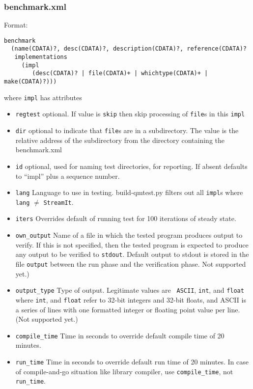 \documentclass[11pt]{article}
\begin{document}
\subsubsection{benchmark.xml}
Format:\begin{verbatim}
benchmark 
  (name(CDATA)?, desc(CDATA)?, description(CDATA)?, reference(CDATA)?
   implementations 
     (impl
        (desc(CDATA)? | file(CDATA)+ | whichtype(CDATA)+ | make(CDATA)?)))
       \end{verbatim}%
where {\tt impl} has attributes
\begin{itemize}
\item {\tt regtest} optional.  If value is {\tt skip} then skip
  processing of {\tt file}s in this {\tt impl} 
\item {\tt dir} optional to indicate that {\tt file}s are in a subdirectory.
The value is the relative address of the subdirectory from the
directory containing the benchmark.xml
\item {\tt id} optional, used for naming test directories, for
  reporting.  If absent defaults to ``impl'' plus a sequence number.
\item {\tt lang} Language to use in testing.  build-qmtest.py filters
  out all {\tt impl}s where {\tt lang} $\neq$ {\tt StreamIt}.
\item {\tt iters} Overrides default of running test for 100 iterations of steady state.
\item {\tt own\_output} Name of a file in which the tested program produces
output to verify.  If this is not specified, then the tested program is
expected to produce any output to be verified to {\tt stdout}.
Default output to stdout is stored in the file {\tt output} between the run
phase and the verification phase.
Not supported yet.)
\item {\tt output\_type} Type of output.  Legitimate values are {\tt
  ASCII}, {\tt int}, and {\tt float} where {\tt int}, and {\tt float}
  refer to 32-bit integers and 32-bit floats, and ASCII is a series of
  lines with one formatted integer or floating point value per line.
(Not supported yet.)
\item {\tt compile\_time} Time in seconds to override default compile time of 20 minutes.
\item {\tt run\_time} Time in seconds to override default run time of 20 minutes.
In case of compile-and-go situation like library compiler, use {\tt compile\_time}, not {\tt run\_time}.
\end{itemize}
\end{document}

